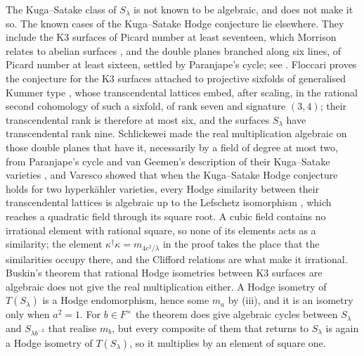 \begin{remark}
\label{rem:mumfordks}
The Kuga--Satake class of $S_{\lambda}$ is not known to be algebraic, and
 does not make it so. The known cases of the Kuga--Satake
Hodge conjecture lie elsewhere. They include the K3 surfaces of Picard number
at least seventeen, which Morrison relates to abelian surfaces \cite{Mor84},
and the double planes branched along six lines, of Picard number
at least sixteen, settled by Paranjape's cycle; see \cite{vG00}. Floccari
proves the conjecture for the K3 surfaces attached to projective sixfolds of
generalised Kummer type \cite{Flo24}, whose transcendental lattices embed,
after scaling, in the rational second cohomology of such a sixfold, of rank
seven and signature $(3,4)$; their transcendental rank is therefore at most
six, and the surfaces $S_{\lambda}$ have transcendental rank nine.
Schlickewei made the real multiplication algebraic on those double planes
that have it, necessarily by a field of degree at most two, from Paranjape's
cycle and van Geemen's description of their Kuga--Satake varieties
\cite{Sch10,vG08}, and Varesco showed that when the Kuga--Satake Hodge
conjecture holds for two hyperk\"ahler varieties, every Hodge similarity
between their transcendental lattices is algebraic up to the Lefschetz
isomorphism \cite{Var23}, which reaches a quadratic field through its square
root. A cubic field contains no irrational element with rational square, so
none of its elements acts as a similarity; the element
$\kappa^{\dagger}\kappa=m_{4e^{2}/\lambda}$ in the proof takes the place that
the similarities occupy there, and the Clifford relations are what make it
irrational. Buskin's theorem that rational Hodge isometries between K3
surfaces are algebraic \cite{Bus19} does not give the real multiplication
either. A Hodge isometry of $T(S_{\lambda})$ is a Hodge endomorphism, hence
some $m_{a}$ by (iii), and it is an isometry only when
$a^{2}=1$. For $b\in F^{\times}$ the theorem does give algebraic cycles between
$S_{\lambda}$ and $S_{\lambda b^{-2}}$ that realise $m_{b}$, but every composite
of them that returns to $S_{\lambda}$ is again a Hodge isometry of
$T(S_{\lambda})$, so it multiplies by an element of square one.


\end{remark}

